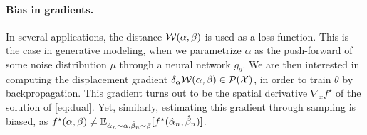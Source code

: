 \paragraph{Bias in gradients.} In several applications, the distance
$\mathcal{W}(\alpha, \beta)$ is used as a loss function. This is the case in generative
modeling, when we parametrize $\alpha$ as the push-forward of some noise
distribution $\mu$ through a neural network $g_\theta$. We are then interested
in computing the displacement gradient $\delta_\alpha \mathcal{W}(\alpha, \beta) \in
\mathcal{P}(\mathcal{X})$, in order to train $\theta$ by backpropagation. This gradient turns
out to be the spatial derivative $\nabla_x f^\star$ of the solution of
\eqref{eq:dual}. Yet, similarly, estimating this gradient through sampling is
biased, as $f^\star(\alpha, \beta) \neq \mathbb{E}_{\hat \alpha_n \sim \alpha, \hat
\beta_n \sim \beta}[f^\star(\hat \alpha_n, \hat \beta_n)]$.

\hfill